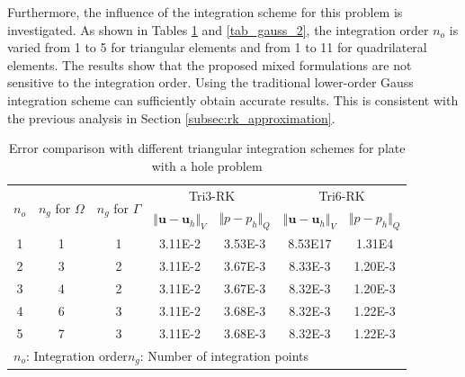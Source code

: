 Furthermore, the influence of the integration scheme for this problem is investigated.
As shown in Tables \ref{tab_gauss_1} and \ref{tab_gauss_2}, the integration order $n_o$ is varied from 1 to 5 for triangular elements and from 1 to 11 for quadrilateral elements.
The results show that the proposed mixed formulations are not sensitive to the integration order.
Using the traditional lower-order Gauss integration scheme can sufficiently obtain accurate results.
This is consistent with the previous analysis in Section \ref{subsec:rk_approximation}.
\begin{table}[H]
\centering
\caption{Error comparison with different triangular integration schemes for plate with a hole problem}
\label{tab_gauss_1}
\begin{tabular}{ccccccc}
\toprule
\multirow{2}{*}{$n_o$} & \multirow{2}{*}{$n_g$ for $\Omega$} & \multirow{2}{*}{$n_g$ for $\Gamma$} & \multicolumn{2}{c}{Tri3-RK} & \multicolumn{2}{c}{Tri6-RK} \\
\shortstack{} & \shortstack{} & \shortstack{} & $\Vert \boldsymbol u-\boldsymbol u_h \Vert_V$ & $\Vert p-p_h \Vert_Q$ & $\Vert \boldsymbol u-\boldsymbol u_h \Vert_V$ & $\Vert p-p_h \Vert_Q$ \\
\midrule
1 & 1 & 1 & 3.11E-2 & 3.53E-3 & 8.53E17 & 1.31E4 \\
2 & 3 & 2 & 3.11E-2 & 3.67E-3 & 8.33E-3 & 1.20E-3 \\
3 & 4 & 2 & 3.11E-2 & 3.67E-3 & 8.32E-3 & 1.20E-3 \\
4 & 6 & 3 & 3.11E-2 & 3.68E-3 & 8.32E-3 & 1.22E-3 \\
5 & 7 & 3 & 3.11E-2 & 3.68E-3 & 8.32E-3 & 1.22E-3 \\
\multicolumn{7}{l}{\footnotesize{$n_o$: Integration order\quad $n_g$: Number of integration points}} \\
\bottomrule
\end{tabular}
\end{table}


